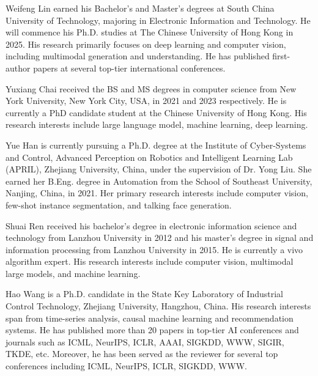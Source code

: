 \begin{IEEEbiography}{Weifeng Lin}
earned his Bachelor's and Master's degrees at South China University of Technology, majoring in Electronic Information and Technology. He will commence his Ph.D. studies at The Chinese University of Hong Kong in 2025. His research primarily focuses on deep learning and computer vision, including multimodal generation and understanding. He has published first-author papers at several top-tier international conferences.
\end{IEEEbiography}

\begin{IEEEbiography}{Yuxiang Chai}
received the BS and MS degrees in computer science from New York University, New York City, USA, in 2021 and 2023 respectively. He is currently a PhD candidate student at the Chinese University of Hong Kong. His research interests include large language model, machine learning, deep learning.
\end{IEEEbiography}

\begin{IEEEbiography}{Yue Han}
is currently pursuing a Ph.D. degree at the Institute of Cyber-Systems and Control, Advanced Perception on Robotics and Intelligent Learning Lab (APRIL), Zhejiang University, China, under the supervision of Dr. Yong Liu. She earned her B.Eng. degree in Automation from the School of Southeast University, Nanjing, China, in 2021. Her primary research interests include computer vision, few-shot instance segmentation, and talking face generation.
\end{IEEEbiography}

\begin{IEEEbiography}{Shuai Ren}
received his bachelor's degree in electronic information science and technology from Lanzhou University in 2012 and his master's degree in signal and information processing from Lanzhou University in 2015. He is currently a vivo algorithm expert. His research interests include computer vision, multimodal large models, and machine learning.
\end{IEEEbiography}

\begin{IEEEbiography}{Hao Wang}
is a Ph.D. candidate in the State Key Laboratory of Industrial Control Technology, Zhejiang University, Hangzhou, China. 
His research interests span from time-series analysis, causal machine learning and recommendation systems.
He has published more than 20 papers in top-tier AI conferences and journals such as ICML, NeurIPS, ICLR, AAAI, SIGKDD, WWW, SIGIR, TKDE, etc.
Moreover, he has been served as the reviewer for several top conferences including ICML, NeurIPS, ICLR, SIGKDD, WWW.
\end{IEEEbiography}

